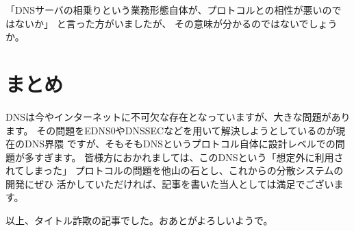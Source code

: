 「DNSサーバの相乗りという業務形態自体が、プロトコルとの相性が悪いのではないか」
と言った方がいましたが、 その意味が分かるのではないでしょうか。


\section{まとめ}
DNSは今やインターネットに不可欠な存在となっていますが、大きな問題があります。
その問題をEDNS0やDNSSECなどを用いて解決しようとしているのが現在のDNS界隈
ですが、そもそもDNSというプロトコル自体に設計レベルでの問題が多すぎます。
皆様方におかれましては、このDNSという「想定外に利用されてしまった」
プロトコルの問題を他山の石とし、これからの分散システムの開発にぜひ
活かしていただければ、記事を書いた当人としては満足でございます。

以上、タイトル詐欺の記事でした。おあとがよろしいようで。

